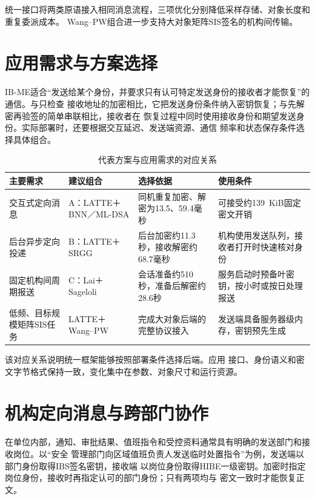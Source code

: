 统一接口将两类原语接入相同消息流程，三项优化分别降低采样存储、对象长度和重复委派成本。
Wang--PW组合进一步支持大对象矩阵SIS签名的机构间传输。

\section{应用需求与方案选择}

IB-ME适合“发送给某个身份，并要求只有认可特定发送身份的接收者才能恢复”的通信。与只检查
接收地址的加密相比，它把发送身份条件纳入密钥恢复；与先解密再验签的简单串联相比，接收者在
恢复过程中同时使用接收身份和期望发送身份。实际部署时，还要根据交互延迟、发送端资源、通信
频率和状态保存条件选择具体组合。

\begin{table}[H]
\centering\small
\caption{代表方案与应用需求的对应关系}
\label{tab:application-choice}
\begin{tabularx}{\textwidth}{@{}>{\raggedright\arraybackslash}p{}>{\raggedright\arraybackslash}p{}>{\raggedright\arraybackslash}p{}>{\raggedright\arraybackslash}X@{}}
\toprule
\rowcolor{black!8} 主要需求 & 建议组合 & 选择依据 & 使用条件 \\
\midrule
交互式定向消息 & A：LATTE＋BNN／ML-DSA & 同机重复加密、解密为13.5、59.4毫秒 & 可接受约139~KiB固定密文开销 \\
后台异步定向投递 & B：LATTE＋SRGG & 后台加密约11.3秒，接收解密约68.7毫秒 & 机构使用发送队列，接收者打开时快速核对身份 \\
固定机构间周期报送 & C：Lai＋Sageloli & 会话准备约510秒，准备后解密约28.6秒 & 服务启动时预备叶密钥，按小时或按日处理报送 \\
低频、目标规模矩阵SIS任务 & LATTE＋Wang--PW & 完成大对象后端的完整协议接入 & 发送端具备服务器级内存，密钥预先生成 \\
\bottomrule
\end{tabularx}
\end{table}

该对应关系说明统一框架能够按照部署条件选择后端。应用
接口、身份语义和密文字节格式保持一致，变化集中在参数、对象尺寸和运行资源。

\section{机构定向消息与跨部门协作}

在单位内部，通知、审批结果、值班指令和受控资料通常具有明确的发送部门和接收岗位。以“安全
管理部门向区域值班负责人发送临时处置指令”为例，发送端以部门身份取得IBS签名密钥，接收端
以岗位身份取得HIBE一级密钥。加密时指定岗位身份，接收时再指定认可的部门身份；只有两项均与
密文一致时才能恢复正文。


